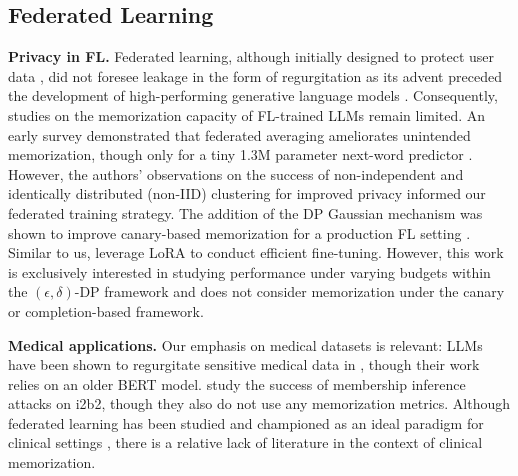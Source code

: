 \subsection{Federated Learning}

\textbf{Privacy in FL.} Federated learning, although initially designed to protect user data \citep{mcmahan2017communication}, did not foresee leakage in the form of regurgitation as its advent preceded the development of high-performing generative language models \citep{kairouz2021advances}. Consequently, studies on the memorization capacity of FL-trained LLMs remain limited. An early survey demonstrated that federated averaging \citep{thakkar2020understanding} ameliorates unintended memorization, though only for a tiny 1.3M parameter next-word predictor \citep{hard2018federated}. However, the authors' observations on the success of non-independent and identically distributed (non-IID) clustering for improved privacy informed our federated training strategy. The addition of the DP Gaussian mechanism was shown to improve canary-based memorization for a production FL setting \citep{ramaswamy2020training}. Similar to us, \citet{liu2024differentially} leverage LoRA to conduct efficient fine-tuning. However, this work is exclusively interested in studying performance under varying budgets within the $(\epsilon, \delta)$-DP framework and does not consider memorization under the canary or completion-based framework.

\textbf{Medical applications.} Our emphasis on medical datasets is relevant: LLMs have been shown to regurgitate sensitive medical data in \citet{lehman2021does}, though their work relies on an older BERT model. 
\citet{mireshghallah2022quantifying} study the success of membership inference attacks on i2b2, though they also do not use any memorization metrics. Although federated learning has been studied and championed as an ideal paradigm for clinical settings \citep{xu2021federated, nguyen2022federated, antunes2022federated}, there is a relative lack of literature in the context of clinical memorization.